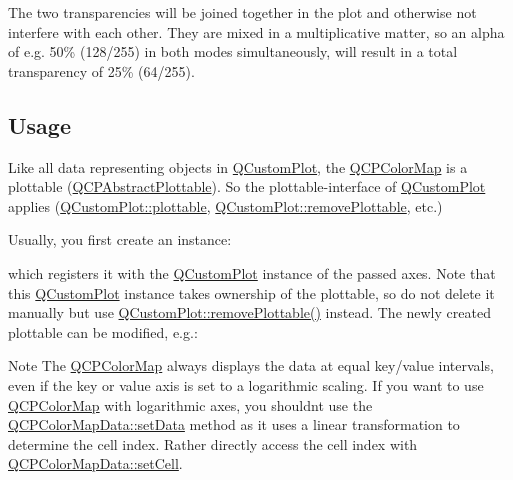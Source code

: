 The two transparencies will be joined together in the plot and otherwise not interfere with each other. They are mixed in a multiplicative matter, so an alpha of e.\+g. 50\% (128/255) in both modes simultaneously, will result in a total transparency of 25\% (64/255).\hypertarget{class_q_c_p_color_map_qcpcolormap-usage}{}\subsection{Usage}\label{class_q_c_p_color_map_qcpcolormap-usage}
Like all data representing objects in \hyperlink{class_q_custom_plot}{Q\+Custom\+Plot}, the \hyperlink{class_q_c_p_color_map}{Q\+C\+P\+Color\+Map} is a plottable (\hyperlink{class_q_c_p_abstract_plottable}{Q\+C\+P\+Abstract\+Plottable}). So the plottable-\/interface of \hyperlink{class_q_custom_plot}{Q\+Custom\+Plot} applies (\hyperlink{class_q_custom_plot_a32de81ff53e263e785b83b52ecd99d6f}{Q\+Custom\+Plot\+::plottable}, \hyperlink{class_q_custom_plot_af3dafd56884208474f311d6226513ab2}{Q\+Custom\+Plot\+::remove\+Plottable}, etc.)

Usually, you first create an instance\+: 
\begin{DoxyCodeInclude}
\end{DoxyCodeInclude}
which registers it with the \hyperlink{class_q_custom_plot}{Q\+Custom\+Plot} instance of the passed axes. Note that this \hyperlink{class_q_custom_plot}{Q\+Custom\+Plot} instance takes ownership of the plottable, so do not delete it manually but use \hyperlink{class_q_custom_plot_af3dafd56884208474f311d6226513ab2}{Q\+Custom\+Plot\+::remove\+Plottable()} instead. The newly created plottable can be modified, e.\+g.\+: 
\begin{DoxyCodeInclude}
\end{DoxyCodeInclude}
 \begin{DoxyNote}{Note}
The \hyperlink{class_q_c_p_color_map}{Q\+C\+P\+Color\+Map} always displays the data at equal key/value intervals, even if the key or value axis is set to a logarithmic scaling. If you want to use \hyperlink{class_q_c_p_color_map}{Q\+C\+P\+Color\+Map} with logarithmic axes, you shouldn\textquotesingle{}t use the \hyperlink{class_q_c_p_color_map_data_afd2083ccfd6987ec94aa7ef8e91ca39a}{Q\+C\+P\+Color\+Map\+Data\+::set\+Data} method as it uses a linear transformation to determine the cell index. Rather directly access the cell index with \hyperlink{class_q_c_p_color_map_data_a8e75eaf8746596319032a93f3d2d0683}{Q\+C\+P\+Color\+Map\+Data\+::set\+Cell}. 
\end{DoxyNote}


